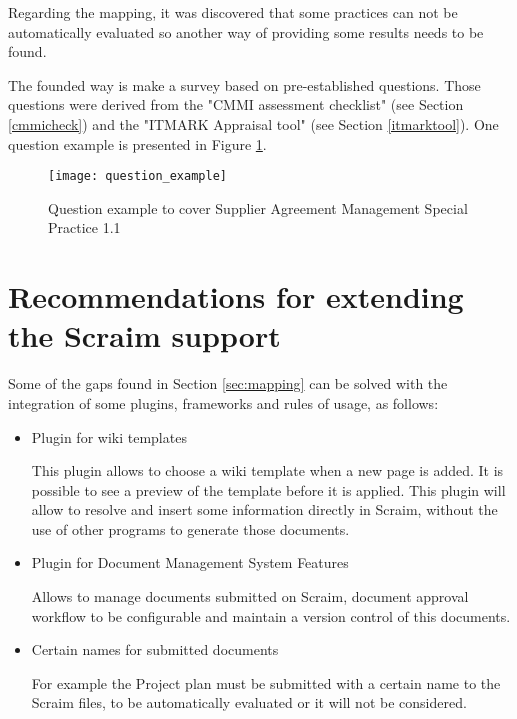 Regarding the mapping, it was discovered  that some practices can not be automatically evaluated so another way of providing some results needs to be found.

The founded way is make a survey based on pre-established questions. Those questions were derived from the "CMMI assessment checklist" (see Section \ref{cmmicheck}) and  the "ITMARK Appraisal tool" (see Section \ref{itmarktool}). One question example is presented in Figure \ref{fig:question_example}.

\begin{figure}[!htb]
	\begin{center}
		\leavevmode
		\texttt{[image: question\_example]}
		\caption{Question example to cover Supplier Agreement Management Special Practice 1.1}
		\label{fig:question_example}
	\end{center}
\end{figure}

\section{Recommendations for extending the Scraim support}

Some of the gaps found in Section \ref{sec:mapping} can be solved with the integration of some plugins, frameworks and rules of usage, as follows:

\begin{itemize}
	\item Plugin for wiki templates \citep{wikitemplates}
	
	This plugin allows to choose a wiki template when a new page is added. It is possible to see a preview of the template before it is applied.
	This plugin will allow to resolve and insert some information directly in Scraim, without the use of other programs to generate those documents.
	
	\item Plugin for Document Management System Features \citep{DMSF}
	
	Allows to manage documents submitted on Scraim, document approval workflow to be configurable and maintain a version control of this documents.
	
	\item Certain names for submitted documents
	
	For example the Project plan must be submitted with a certain name to the Scraim files, to be automatically evaluated or it will not be considered.
	
\end{itemize}
